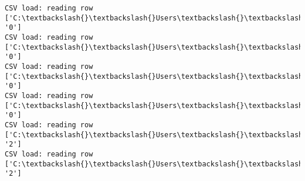 \documentclass[11pt]{article}
\begin{document}
\begin{Verbatim}[commandchars=\\\{\}]
CSV load: reading row ['C:\textbackslash{}\textbackslash{}Users\textbackslash{}\textbackslash{}AbhishekGangadhar\textbackslash{}\textbackslash{}Downloads\textbackslash{}\textbackslash{}ActionRecog\textbackslash{}\textbackslash{}ActionRecog\textbackslash{}\textbackslash{}DataSets\textbackslash{}\textbackslash{}UCF11\textbackslash{}\textbackslash{}action\_youtube\_naudio\textbackslash{}\textbackslash{}biking\textbackslash{}\textbackslash{}v\_biking\_07\textbackslash{}\textbackslash{}v\_biking\_07\_03.avi', '0']
CSV load: reading row ['C:\textbackslash{}\textbackslash{}Users\textbackslash{}\textbackslash{}AbhishekGangadhar\textbackslash{}\textbackslash{}Downloads\textbackslash{}\textbackslash{}ActionRecog\textbackslash{}\textbackslash{}ActionRecog\textbackslash{}\textbackslash{}DataSets\textbackslash{}\textbackslash{}UCF11\textbackslash{}\textbackslash{}action\_youtube\_naudio\textbackslash{}\textbackslash{}biking\textbackslash{}\textbackslash{}v\_biking\_07\textbackslash{}\textbackslash{}v\_biking\_07\_04.avi', '0']
CSV load: reading row ['C:\textbackslash{}\textbackslash{}Users\textbackslash{}\textbackslash{}AbhishekGangadhar\textbackslash{}\textbackslash{}Downloads\textbackslash{}\textbackslash{}ActionRecog\textbackslash{}\textbackslash{}ActionRecog\textbackslash{}\textbackslash{}DataSets\textbackslash{}\textbackslash{}UCF11\textbackslash{}\textbackslash{}action\_youtube\_naudio\textbackslash{}\textbackslash{}biking\textbackslash{}\textbackslash{}v\_biking\_07\textbackslash{}\textbackslash{}v\_biking\_07\_05.avi', '0']
CSV load: reading row ['C:\textbackslash{}\textbackslash{}Users\textbackslash{}\textbackslash{}AbhishekGangadhar\textbackslash{}\textbackslash{}Downloads\textbackslash{}\textbackslash{}ActionRecog\textbackslash{}\textbackslash{}ActionRecog\textbackslash{}\textbackslash{}DataSets\textbackslash{}\textbackslash{}UCF11\textbackslash{}\textbackslash{}action\_youtube\_naudio\textbackslash{}\textbackslash{}biking\textbackslash{}\textbackslash{}v\_biking\_07\textbackslash{}\textbackslash{}v\_biking\_07\_06.avi', '0']
CSV load: reading row ['C:\textbackslash{}\textbackslash{}Users\textbackslash{}\textbackslash{}AbhishekGangadhar\textbackslash{}\textbackslash{}Downloads\textbackslash{}\textbackslash{}ActionRecog\textbackslash{}\textbackslash{}ActionRecog\textbackslash{}\textbackslash{}DataSets\textbackslash{}\textbackslash{}UCF11\textbackslash{}\textbackslash{}action\_youtube\_naudio\textbackslash{}\textbackslash{}trampoline\_jumping\textbackslash{}\textbackslash{}v\_jumping\_01\textbackslash{}\textbackslash{}v\_jumping\_01\_01.avi', '2']
CSV load: reading row ['C:\textbackslash{}\textbackslash{}Users\textbackslash{}\textbackslash{}AbhishekGangadhar\textbackslash{}\textbackslash{}Downloads\textbackslash{}\textbackslash{}ActionRecog\textbackslash{}\textbackslash{}ActionRecog\textbackslash{}\textbackslash{}DataSets\textbackslash{}\textbackslash{}UCF11\textbackslash{}\textbackslash{}action\_youtube\_naudio\textbackslash{}\textbackslash{}trampoline\_jumping\textbackslash{}\textbackslash{}v\_jumping\_01\textbackslash{}\textbackslash{}v\_jumping\_01\_02.avi', '2']

\end{Verbatim}
\end{document}
